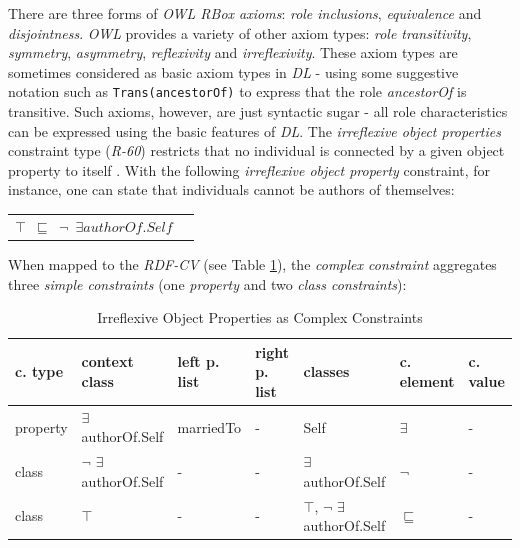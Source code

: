 \documentclass[a4paper,fontsize=11pt]{scrartcl}
\newcommand{\ms}[1]{\texttt{#1}}
\newenvironment{DL}{
  \vspace{0cm}
	\begin{center}
  \begin{tabular}{r l}

}{
  \end{tabular}
	\end{center}
}
\begin{document}
There are three forms of \emph{OWL RBox axioms}: \emph{role inclusions}, \emph{equivalence} and \emph{disjointness}. 
\emph{OWL} provides a variety of other axiom types: \emph{role transitivity}, \emph{symmetry}, \emph{asymmetry}, \emph{reflexivity} and \emph{irreflexivity}. 
These axiom types are sometimes considered as basic axiom types in \emph{DL} - using some suggestive notation such as
\ms{Trans(ancestorOf)} to express that the role \emph{ancestorOf} is transitive.
Such axioms, however, are just syntactic sugar - 
all role characteristics can be expressed using the basic features of \emph{DL}.
The \emph{irreflexive object properties} constraint type (\emph{R-60}) 
restricts that no individual is connected by a given object property to itself \cite{Kroetzsch2012}.
With the following \emph{irreflexive object property} constraint, for instance, one can state that individuals cannot be authors of themselves:
\begin{DL}
\ms{$\top$ $\sqsubseteq$ $\neg$ $\exists authorOf.Self$}
\end{DL}
When mapped to the \emph{RDF-CV} (see Table \ref{tab:irreflexive-object-properties-as-complex-constraints}), the \emph{complex constraint} aggregates three \emph{simple constraints} (one \emph{property} and two \emph{class constraints}):


\begin{table}
  \scriptsize
  \sffamily
  \vspace{0cm}
	\caption{Irreflexive Object Properties as Complex Constraints}
	\label{tab:irreflexive-object-properties-as-complex-constraints}
	\centering
		\begin{tabular}{l|l|l|l|l|l|l}
      \textbf{c. type} & \textbf{context class} & \textbf{left p. list} & \textbf{right p. list} & \textbf{classes} & \textbf{c. element} & \textbf{c. value} \\
      \hline
property & $\exists$ authorOf.Self & marriedTo & - & Self & $\exists$ & - \\
class & $\neg$ $\exists$ authorOf.Self & - & - & $\exists$ authorOf.Self & $\neg$ & - \\
class & $\top$ & - & - & $\top$, $\neg$ $\exists$ authorOf.Self & $\sqsubseteq$ & - \\
		\end{tabular}
\end{table}
\end{document}
